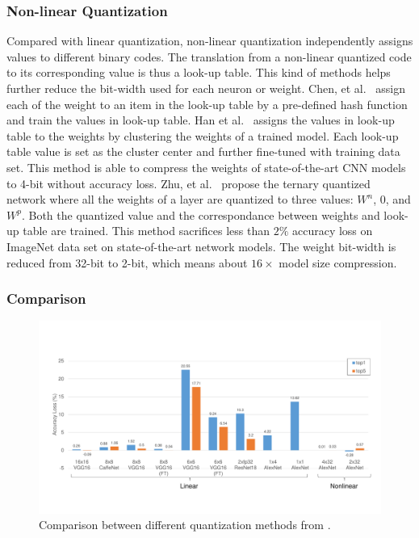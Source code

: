 \subsubsection{Non-linear Quantization}
Compared with linear quantization, non-linear quantization independently assigns values to different binary codes. The translation from a non-linear quantized code to its corresponding value is thus a look-up table. This kind of methods helps further reduce the bit-width used for each neuron or weight. Chen, et al.~\cite{chen2015compressing} assign each of the weight to an item in the look-up table by a pre-defined hash function and train the values in look-up table. Han et al.~\cite{han2015deep} assigns the values in look-up table to the weights by clustering the weights of a trained model. Each look-up table value is set as the cluster center and further fine-tuned with training data set. This method is able to compress the weights of state-of-the-art CNN models to 4-bit without accuracy loss. Zhu, et al.~\cite{zhu2016trained} propose the ternary quantized network where all the weights of a layer are quantized to three values: $W^n$, 0, and $W^p$. Both the quantized value and the correspondance between weights and look-up table are trained. This method sacrifices less than $2\%$ accuracy loss on ImageNet data set on state-of-the-art network models. The weight bit-width is reduced from 32-bit to 2-bit, which means about $16\times$ model size compression.

\subsubsection{Comparison}
\begin{figure}[ht]
    \centering
    \includegraphics[width=1.0\columnwidth]{fig/quantization.pdf}
    \caption{Comparison between different quantization methods from \cite{qiu2016going, guo2017angel, han2015deep, zhu2016trained, zhou2016dorefa, li2016ternary}.}
    \label{fig:quantization}
\end{figure}

